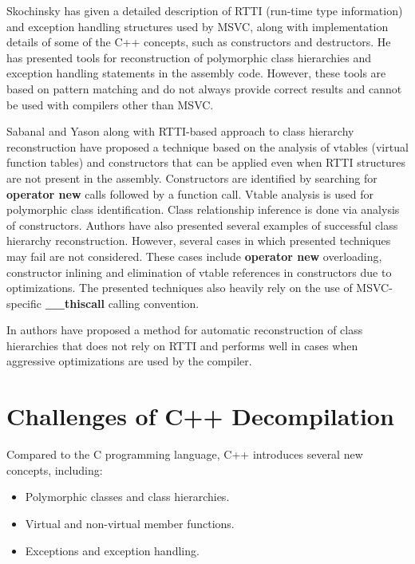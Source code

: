 \documentclass[10pt, conference, compsocconf]{IEEEtran}
\newcommand{\compact}{}
\newcommand{\skipspace}{}
\newcommand{\skipsectionspace}{}
\begin{document}
Skochinsky \cite{skochinsky06e, skochinsky06c} has given a detailed description
of RTTI (run-time type information) and exception handling structures used by MSVC,
along with implementation details of some of the C++ concepts,
such as constructors and destructors.
He has presented tools for reconstruction of polymorphic class hierarchies and
exception handling statements in the assembly code.
However, these tools are based on pattern matching and do not always provide correct
results and cannot be used with compilers other than MSVC.

Sabanal and Yason \cite{sabanal07} along with RTTI-based approach
to class hierarchy reconstruction
have proposed a technique based on the analysis of vtables (virtual function tables) and
constructors that can be applied even when RTTI structures are
not present in the assembly.
Constructors are identified by searching for \textbf{operator new}
calls followed by a function call.
Vtable analysis is used for polymorphic class identification.
Class relationship inference is done via analysis of constructors.
Authors have also presented several examples of successful class
hierarchy reconstruction.
However, several cases in which presented techniques may fail are
not considered.
These cases include \textbf{operator new} overloading,
constructor inlining and elimination of vtable references in
constructors due to optimizations.
The presented techniques also heavily rely on the use of
MSVC-specific \textbf{\_\_thiscall} calling convention.

In \cite{fokin10} authors have proposed a
method for automatic reconstruction of class hierarchies
that does not rely on RTTI and performs well in cases
when aggressive optimizations are used by the compiler.




\section{Challenges of C++ Decompilation}\label{sectionChallenges}\skipsectionspace
Compared to the C programming language, C++ introduces several new concepts, including:
\skipspace\begin{itemize}\compact
\item Polymorphic classes and class hierarchies.
\item Virtual and non-virtual member functions.
\item Exceptions and exception handling.
\end{itemize}
\end{document}
